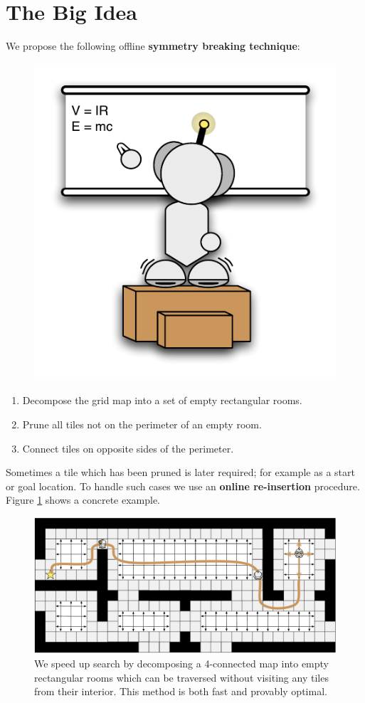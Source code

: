 \section{The Big Idea}
We propose the following offline \textbf{symmetry breaking technique}: 
 \begin{figure}
       \vspace{2em}
		\includegraphics[width=0.25\columnwidth, trim=10mm 10mm 10mm 10mm]{diagrams/robot_whiteboard.pdf}
 \end{figure}
\begin{enumerate}
\item{Decompose the grid map into a set of empty rectangular rooms.}
\item{Prune all tiles not on the perimeter of an empty room.}
\item{Connect tiles on opposite sides of the perimeter.}
\end{enumerate}
\vspace{1em}
Sometimes a tile which has been pruned is later required; for example as a start
or goal location. 
To handle such cases we use an \textbf{online re-insertion} procedure.
Figure \ref{fig:splash} shows a concrete example.

\begin{figure}[t]
\hspace{0.35in}
\begin{minipage}{17in}
\label{fig:splash}
\begin{center}
\includegraphics[width=17in]{diagrams/robot_map.pdf}
\caption{We speed up search by decomposing a 4-connected map into empty rectangular
rooms which can be traversed without visiting any tiles from their interior.
This method is both fast and provably optimal.}
\end{center}
\end{minipage}
\vspace{1em}
\end{figure}

\pagebreak
